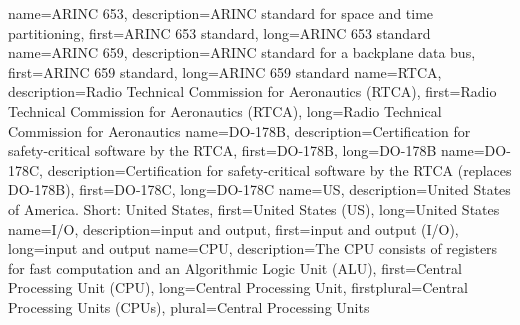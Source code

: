 {%
    name={ARINC 653},
    description={ARINC standard for space and time partitioning},
    first={ARINC 653 standard},
    long={ARINC 653 standard}
}
{%
    name={ARINC 659},
    description={ARINC standard for a backplane data bus},
    first={ARINC 659 standard},
    long={ARINC 659 standard}
}
{%
    name={RTCA},
    description={Radio Technical Commission for Aeronautics (RTCA)},
    first={Radio Technical Commission for Aeronautics (RTCA)},
    long={Radio Technical Commission for Aeronautics}
}
{%
    name={DO-178B},
    description={Certification for safety-critical software by the RTCA},
    first={DO-178B},
    long={DO-178B}
}
{%
    name={DO-178C},
    description={Certification for safety-critical software by the RTCA (replaces DO-178B)},
    first={DO-178C},
    long={DO-178C}
}
{%
    name={US},
    description={United States of America. Short: United States},
    first={United States (US)},
    long={United States}
}
{%
    name={I/O},
    description={input and output},
    first={input and output (I/O)},
    long={input and output}
}
{%
    name={CPU},
    description={The CPU consists of registers for fast computation and an Algorithmic Logic Unit (ALU)},
    first={Central Processing Unit (CPU)},
    long={Central Processing Unit},
    firstplural={Central Processing Units (CPUs)},
    plural={Central Processing Units}
}

